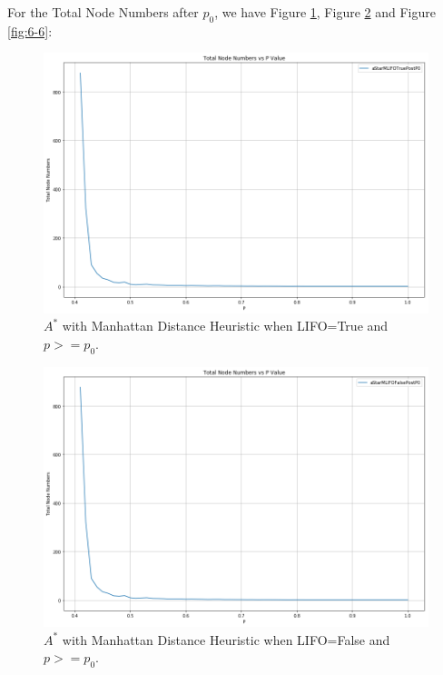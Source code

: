 \documentclass[letter]{article}
\begin{document}
\begin{questions}
	For the Total Node Numbers after $ p_0 $, we have Figure \ref{fig:6-4}, Figure \ref{fig:6-5} and Figure \ref{fig:6-6}: \\
	
	\begin{figure}
		\centering
		\includegraphics[width=\textwidth]{../pics/question6-4.png}
		\caption{\label{fig:6-4} $ A^* $ with Manhattan Distance Heuristic when LIFO=True and $ p >= p_0 $.}
	\end{figure}
	
	\begin{figure}
		\centering
		\includegraphics[width=\textwidth]{../pics/question6-5.png}
		\caption{\label{fig:6-5}$ A^* $ with Manhattan Distance Heuristic when LIFO=False and $ p >= p_0 $.}
	\end{figure}


\end{questions}
\end{document}
